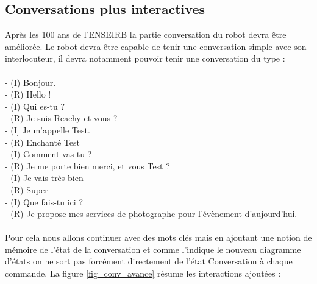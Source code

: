 \subsection{Conversations plus interactives} \label{subsec_conv_avancée}
Après les 100 ans de l'ENSEIRB la partie conversation du robot devra être améliorée. Le robot devra être capable de tenir une conversation simple avec son interlocuteur, il devra notamment pouvoir tenir une conversation du type : \\
\ \\
- (I) Bonjour.\\
- (R) Hello !\\
- (I) Qui es-tu ? \\ 
- (R) Je suis Reachy et vous ? \\ 
- (I] Je m'appelle Test. \\
- (R) Enchanté Test\\
- (I) Comment vas-tu ? \\
- (R) Je me porte bien merci, et vous Test ? \\
- (I) Je vais très bien \\
- (R) Super \\
- (I) Que fais-tu ici ? \\ 
- (R) Je propose mes services de photographe pour l'évènement d'aujourd'hui. \\
\ \\

Pour cela nous allons continuer avec des mots clés mais en ajoutant une notion de mémoire de l'état de la conversation et comme l'indique le nouveau diagramme d'états on ne sort pas forcément directement de l'état Conversation à chaque commande. La figure \ref{fig_conv_avance} résume les interactions ajoutées : 

